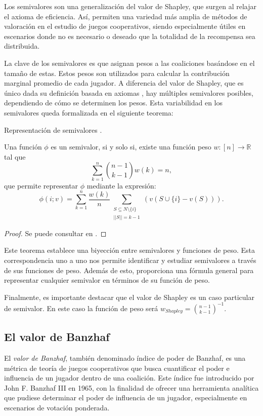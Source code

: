 Los semivalores son una generalización del valor de Shapley,
que surgen al relajar el axioma de eficiencia. Así, permiten
una variedad más amplia de métodos de valoración en el estudio
de juegos cooperativos, siendo especialmente útiles en escenarios
donde no es necesario o deseado que la totalidad de la recompensa
sea distribuida.

La clave de los semivalores es que asignan pesos a las
coaliciones basándose en el tamaño de estas. Estos pesos
son utilizados para calcular la contribución marginal promedio
de cada jugador. A diferencia del valor de Shapley, que es
único dada su definición basada en axiomas \cite{shapleyValue},
hay múltiples semivalores posibles, dependiendo de cómo se
determinen los pesos. Esta variabilidad en los semivalores queda
formalizada en el siguiente teorema:

\begin{theorem}{Representación de semivalores \cite{Dubey2}.}
  
  Una función $\phi$ es un semivalor, si y solo
  si, existe una función peso $w:[n] \rightarrow
  \mathbb{R}$ tal que
  $$\sum_{k=1}^n \binom{n-1}{k-1}w(k) = n,$$
  que permite representar $\phi$ mediante la expresión:
  $$
  \phi(i;v) = \sum_{k=1}^n \frac{w(k)}{n}
  \sum_{\substack{S \subseteq N \setminus \{i\} \\ ||S||=k-1}}
  (v(S\cup \{i\} - v(S))).
  $$
\end{theorem}

\begin{proof}
  Se puede consultar en \cite{Dubey2}.
\end{proof}

Este teorema establece una biyección entre semivalores y
funciones de peso. Esta correspondencia uno a uno
nos permite identificar y estudiar semivalores a través
de sus funciones de peso. Además de esto, proporciona
una fórmula general para representar cualquier semivalor
en términos de su función de peso.

Finalmente, es importante destacar que el valor de Shapley
es un caso particular de semivalor. En este caso la función
de peso será $w_{Shapley} = \binom{n-1}{k-1}^{-1}$.


\subsection{El valor de Banzhaf}

El \emph{valor de Banzhaf}, también denominado índice de poder
de Banzhaf\cite{banzhaf}, es una métrica de teoría de juegos
cooperativos que busca cuantificar el poder e influencia de un
jugador dentro de una coalición.
Este índice fue introducido por John F. Banzhaf III en 1965,
con la finalidad de ofrecer una herramienta analítica que
pudiese determinar el poder de influencia de un jugador,
especialmente en escenarios de votación ponderada.

